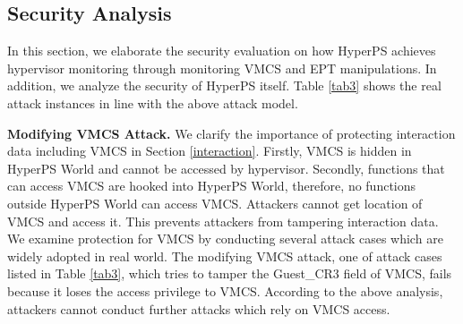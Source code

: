 \documentclass[conference]{IEEEtran}
\begin{document}
\subsection{Security Analysis}
 
In this section, we elaborate the security evaluation on how HyperPS achieves hypervisor monitoring through monitoring VMCS and EPT manipulations. 
In addition, we analyze the security of HyperPS itself. Table \ref{tab3} shows the real attack instances in line with the above attack model. 



\textbf{Modifying VMCS Attack.}
We clarify the importance of protecting interaction data including VMCS in Section \ref{interaction}.
 Firstly, VMCS is hidden in HyperPS World and cannot be accessed by hypervisor. Secondly, functions that can access VMCS are hooked into HyperPS World, therefore, no functions outside HyperPS World can access VMCS. Attackers cannot get location of VMCS and access it. This prevents attackers from tampering interaction data. We examine protection for VMCS by conducting several attack cases which are widely adopted in real world. 
The modifying VMCS attack, one of attack cases listed in Table \ref{tab3}, which tries to tamper the Guest\_CR3 field of VMCS, fails because it loses the access privilege to VMCS. According to the above analysis, attackers cannot conduct further attacks which rely on VMCS access.
\end{document}
